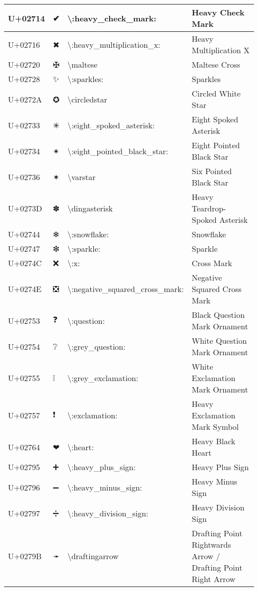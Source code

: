 \begin{table}[h]
\begin{tabulary}{\linewidth}{|L|L|L|L|}
\hline
U+02714 & ✔ & {\textbackslash}:heavy\_check\_mark: & Heavy Check Mark \\
\hline
U+02716 & ✖ & {\textbackslash}:heavy\_multiplication\_x: & Heavy Multiplication X \\
\hline
U+02720 & ✠ & {\textbackslash}maltese & Maltese Cross \\
\hline
U+02728 & ✨ & {\textbackslash}:sparkles: & Sparkles \\
\hline
U+0272A & ✪ & {\textbackslash}circledstar & Circled White Star \\
\hline
U+02733 & ✳ & {\textbackslash}:eight\_spoked\_asterisk: & Eight Spoked Asterisk \\
\hline
U+02734 & ✴ & {\textbackslash}:eight\_pointed\_black\_star: & Eight Pointed Black Star \\
\hline
U+02736 & ✶ & {\textbackslash}varstar & Six Pointed Black Star \\
\hline
U+0273D & ✽ & {\textbackslash}dingasterisk & Heavy Teardrop-Spoked Asterisk \\
\hline
U+02744 & ❄ & {\textbackslash}:snowflake: & Snowflake \\
\hline
U+02747 & ❇ & {\textbackslash}:sparkle: & Sparkle \\
\hline
U+0274C & ❌ & {\textbackslash}:x: & Cross Mark \\
\hline
U+0274E & ❎ & {\textbackslash}:negative\_squared\_cross\_mark: & Negative Squared Cross Mark \\
\hline
U+02753 & ❓ & {\textbackslash}:question: & Black Question Mark Ornament \\
\hline
U+02754 & ❔ & {\textbackslash}:grey\_question: & White Question Mark Ornament \\
\hline
U+02755 & ❕ & {\textbackslash}:grey\_exclamation: & White Exclamation Mark Ornament \\
\hline
U+02757 & ❗ & {\textbackslash}:exclamation: & Heavy Exclamation Mark Symbol \\
\hline
U+02764 & ❤ & {\textbackslash}:heart: & Heavy Black Heart \\
\hline
U+02795 & ➕ & {\textbackslash}:heavy\_plus\_sign: & Heavy Plus Sign \\
\hline
U+02796 & ➖ & {\textbackslash}:heavy\_minus\_sign: & Heavy Minus Sign \\
\hline
U+02797 & ➗ & {\textbackslash}:heavy\_division\_sign: & Heavy Division Sign \\
\hline
U+0279B & ➛ & {\textbackslash}draftingarrow & Drafting Point Rightwards Arrow / Drafting Point Right Arrow \\

\end{tabulary}
\end{table}
